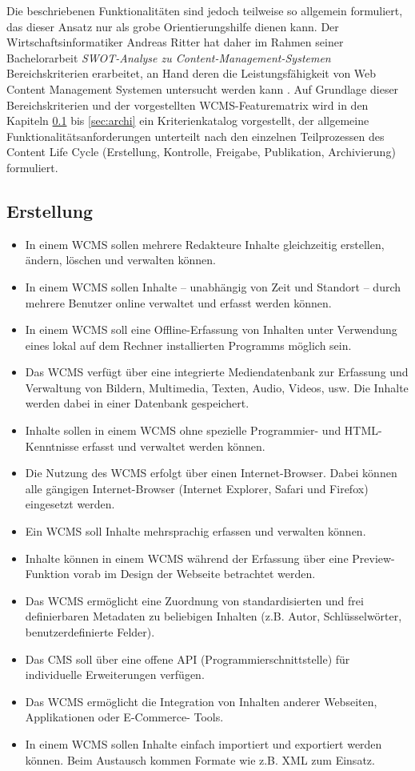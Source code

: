 Die beschriebenen Funktionalitäten sind jedoch teilweise so allgemein formuliert, das dieser Ansatz nur als grobe Orientierungshilfe dienen kann. Der Wirtschaftsinformatiker Andreas Ritter hat daher im Rahmen seiner Bachelorarbeit \emph{SWOT-Analyse zu Content-Management-Systemen} \cite{RitterSwot} Bereichskriterien erarbeitet, an Hand deren die Leistungsfähigkeit von Web Content Management Systemen untersucht werden kann \citep[][Seite 21-23]{RitterSwot}. Auf Grundlage dieser Bereichskriterien und der vorgestellten WCMS-Featurematrix wird in den Kapiteln \ref{sec:erstellung} bis \ref{sec:archi} ein Kriterienkatalog vorgestellt, der allgemeine Funktionalitätsanforderungen unterteilt nach den einzelnen Teilprozessen des Content Life Cycle (Erstellung, Kontrolle, Freigabe, Publikation, Archivierung) formuliert.

\subsection{Erstellung}
\label{sec:erstellung}
\begin{itemize}
\item
In einem WCMS sollen mehrere Redakteure Inhalte gleichzeitig erstellen, ändern, löschen und verwalten können.
\item
In einem WCMS sollen Inhalte – unabhängig von Zeit und Standort – durch mehrere Benutzer online verwaltet und erfasst werden können.
\item
In einem WCMS soll eine Offline-Erfassung von Inhalten unter Verwendung eines lokal auf dem Rechner installierten Programms möglich sein.
\item
Das WCMS verfügt über eine integrierte Mediendatenbank zur Erfassung und Verwaltung von Bildern, Multimedia, Texten, Audio, Videos, usw. Die Inhalte werden dabei in einer Datenbank gespeichert.
\item
Inhalte sollen in einem WCMS ohne spezielle Programmier- und HTML-Kenntnisse erfasst und verwaltet werden können.
\item
Die Nutzung des WCMS erfolgt über einen Internet-Browser. Dabei können alle gängigen Internet-Browser (Internet Explorer, Safari und Firefox) eingesetzt werden.
\item
Ein WCMS soll Inhalte mehrsprachig erfassen und verwalten können.
\item
Inhalte können in einem WCMS während der Erfassung über eine Preview-Funktion vorab im Design der Webseite betrachtet werden.
\item
Das WCMS ermöglicht eine Zuordnung von standardisierten und frei definierbaren Metadaten zu beliebigen Inhalten (z.B. Autor, Schlüsselwörter, benutzerdefinierte Felder).
\item
Das CMS soll über eine offene API (Programmierschnittstelle) für individuelle Erweiterungen verfügen.
\item
Das WCMS ermöglicht die Integration von Inhalten anderer Webseiten, Applikationen oder E-Commerce- Tools.
\item
In einem WCMS sollen Inhalte einfach importiert und exportiert werden können. Beim Austausch kommen Formate wie z.B. XML zum Einsatz.
\end{itemize}



